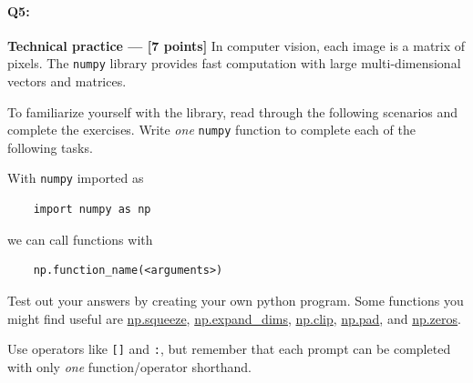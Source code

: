 \documentclass[11pt]{article}
\begin{document}
\paragraph{Q5:} \textbf{Technical practice --- [7 points]}  In computer vision, each image is a matrix of pixels. The \texttt{numpy} library provides fast computation with large multi-dimensional vectors and matrices. 

To familiarize yourself with the library, read through the following scenarios and complete the exercises. Write \emph{one} \texttt{numpy} function to complete each of the following tasks.

With \texttt{numpy} imported as
\begin{verbatim}
    import numpy as np
\end{verbatim}
we can call functions with 
\begin{verbatim}
    np.function_name(<arguments>)
\end{verbatim}
Test out your answers by creating your own python program. Some functions you might find useful are \href{https://numpy.org/doc/stable/reference/generated/numpy.squeeze.html}{np.squeeze}, \href{https://numpy.org/doc/stable/reference/generated/numpy.expand_dims.html}{np.expand\_dims}, \href{https://numpy.org/doc/stable/reference/generated/numpy.clip.html}{np.clip}, \href{https://numpy.org/doc/stable/reference/generated/numpy.pad.html}{np.pad}, and \href{https://numpy.org/doc/stable/reference/generated/numpy.zeros.html}{np.zeros}.

Use operators like \texttt{[]} and \texttt{:}, but remember that each prompt can be completed with only \textit{one} function/operator shorthand.
\end{document}
